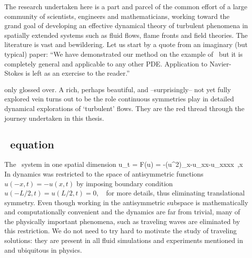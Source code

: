 The research undertaken here is a part and parcel of the
common effort of a large community of scientists, engineers and
mathematicians, working toward the grand goal of developing an effective
dynamical theory of turbulent phenomena in spatially extended systems
such as fluid flows, flame fronts and field theories.
The literature is vast and bewildering. Let us start by a
quote from an imaginary (but typical) paper: ``We have
demonstrated our method on the example of \KSe\ but it is completely
general and applicable to any other PDE. Application to
Navier-Stokes is left as an exercise to the reader.''

 only glossed over.
A rich, perhaps beautiful, and --surprisingly--  not yet fully explored
vein turns out to be the role continuous symmetries play in detailed dynamical explorations
of `turbulent' flows. They are the red thread through the journey undertaken in this thesis.


\subsection{\KS\ equation}

The \KS\ system in one spatial dimension
\beq
  u_t = F(u) = -{\textstyle{}}(u^2)_x-u_{xx}-u_{xxxx}
    \,,\qquad   x \in [-L/2,L/2]
 In  dynamics was restricted
to the space of antisymmetric functions $u(-x,t)=-u(x,t)$ by imposing
boundary condition $u(-L/2,t)=u(L/2,t)=0$, \cf\  for more
details, thus eliminating translational symmetry. Even though working in the antisymmetric
subspace is mathematically and computationally convenient and the dynamics are far
from trivial, many of the physically important phenomena,
such as traveling waves are eliminated by this restriction.
We do not need to try hard to motivate the
study of traveling solutions: they are present in all fluid simulations and experiments
mentioned in  and ubiquitous in physics.

